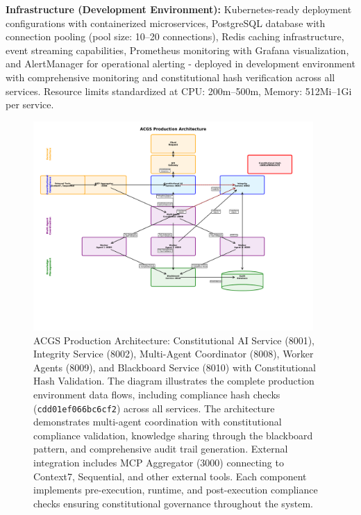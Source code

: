 \documentclass[manuscript,screen,9pt]{acmart}
\begin{document}
\textbf{Infrastructure (Development Environment):}
Kubernetes-ready deployment configurations with containerized microservices, PostgreSQL database with connection pooling (pool size: 10--20 connections), Redis caching infrastructure, event streaming capabilities, Prometheus monitoring with Grafana visualization, and AlertManager for operational alerting - deployed in development environment with comprehensive monitoring and constitutional hash verification across all services. Resource limits standardized at CPU: 200m--500m, Memory: 512Mi--1Gi per service.
\begin{figure}[!htb]
	\centering
	\includegraphics[width=0.95\textwidth,keepaspectratio]{figures/production_architecture.pdf}
	\caption[ACGS Production Architecture]{ACGS Production Architecture: Constitutional AI Service (8001), Integrity Service (8002), Multi-Agent Coordinator (8008), Worker Agents (8009), and Blackboard Service (8010) with Constitutional Hash Validation. The diagram illustrates the complete production environment data flows, including compliance hash checks (\texttt{cdd01ef066bc6cf2\cite{perf-report}}) across all services. The architecture demonstrates multi-agent coordination with constitutional compliance validation, knowledge sharing through the blackboard pattern, and comprehensive audit trail generation. External integration includes MCP Aggregator (3000) connecting to Context7, Sequential, and other external tools. Each component implements pre-execution, runtime, and post-execution compliance checks ensuring constitutional governance throughout the system.}
	\label{fig:architecture}
\end{figure}
\end{document}
